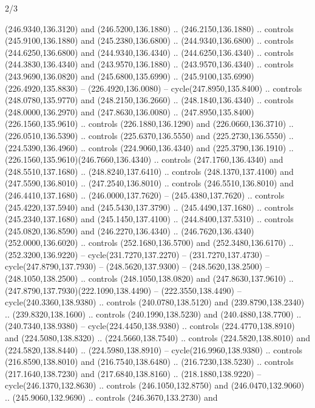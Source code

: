 \begin{flagdescription}{2/3}
\begin{scope}[xshift=0.5\flaglength,yshift=0.5\flagwidth,scale=\flagwidth/259.2]
\begin{scope}[y=0.8pt, x=0.8pt, yscale=-1,shift={(-243,-162)}]
      (246.9340,136.3120) and (246.5200,136.1880) .. (246.2150,136.1880) .. controls
      (245.9100,136.1880) and (245.2380,136.6800) .. (244.9340,136.6800) .. controls
      (244.6250,136.6800) and (244.9340,136.4340) .. (244.6250,136.4340) .. controls
      (244.3830,136.4340) and (243.9570,136.1880) .. (243.9570,136.4340) .. controls
      (243.9690,136.0820) and (245.6800,135.6990) ..
      (245.9100,135.6990)(226.4920,135.8830) -- (226.4920,136.0080) --
      cycle(247.8950,135.8400) .. controls (248.0780,135.9770) and
      (248.2150,136.2660) .. (248.1840,136.4340) .. controls (248.0000,136.2970) and
      (247.8630,136.0080) .. (247.8950,135.8400)(226.1560,135.9610) .. controls
      (226.1880,136.1290) and (226.0660,136.3710) .. (226.0510,136.5390) .. controls
      (225.6370,136.5550) and (225.2730,136.5550) .. (224.5390,136.4960) .. controls
      (224.9060,136.4340) and (225.3790,136.1910) ..
      (226.1560,135.9610)(246.7660,136.4340) .. controls (247.1760,136.4340) and
      (248.5510,137.1680) .. (248.8240,137.6410) .. controls (248.1370,137.4100) and
      (247.5590,136.8010) .. (247.2540,136.8010) .. controls (246.5510,136.8010) and
      (246.4410,137.1680) .. (246.0000,137.7620) -- (245.4380,137.7620) .. controls
      (245.4220,137.5940) and (245.5430,137.3790) .. (245.4490,137.1680) .. controls
      (245.2340,137.1680) and (245.1450,137.4100) .. (244.8400,137.5310) .. controls
      (245.0820,136.8590) and (246.2270,136.4340) ..
      (246.7620,136.4340)(252.0000,136.6020) .. controls (252.1680,136.5700) and
      (252.3480,136.6170) .. (252.3200,136.9220) -- cycle(231.7270,137.2270) --
      (231.7270,137.4730) -- cycle(247.8790,137.7930) -- (248.5620,137.9300) --
      (248.5620,138.2500) -- (248.1050,138.2500) .. controls (248.1050,138.0820) and
      (247.8630,137.9610) .. (247.8790,137.7930)(222.1090,138.4490) --
      (222.3550,138.4490) -- cycle(240.3360,138.9380) .. controls
      (240.0780,138.5120) and (239.8790,138.2340) .. (239.8320,138.1600) .. controls
      (240.1990,138.5230) and (240.4880,138.7700) .. (240.7340,138.9380) --
      cycle(224.4450,138.9380) .. controls (224.4770,138.8910) and
      (224.5080,138.8320) .. (224.5660,138.7540) .. controls (224.5820,138.8010) and
      (224.5820,138.8440) .. (224.5980,138.8910) -- cycle(216.9960,138.9380) ..
      controls (216.8590,138.8010) and (216.7540,138.6480) .. (216.7230,138.5230) ..
      controls (217.1640,138.7230) and (217.6840,138.8160) .. (218.1880,138.9220) --
      cycle(246.1370,132.8630) .. controls (246.1050,132.8750) and
      (246.0470,132.9060) .. (245.9060,132.9690) .. controls (246.3670,133.2730) and

\end{scope}
\end{scope}
\end{flagdescription}
